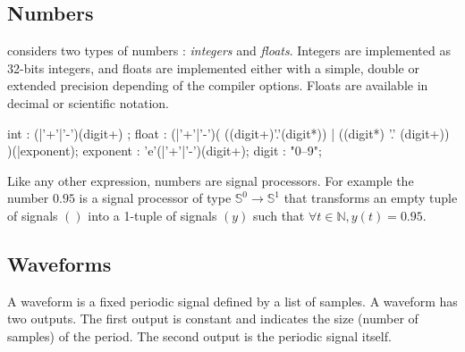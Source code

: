 \subsection{Numbers}

\faust considers two types of numbers : \textit{integers} and \textit{floats}. Integers are implemented as 32-bits integers, and floats are implemented either with a simple, double or extended precision depending of the compiler options. Floats are available in decimal or scientific notation. 

  \begin{rail}
  int : (|'+'|'-')(digit+) ;
  float : (|'+'|'-')( ((digit+)'.'(digit*)) | ((digit*) '.' (digit+)) )(|exponent);
  exponent : 'e'(|'+'|'-')(digit+);
  digit : "0--9";
  \end{rail}

\bigskip

Like any other \faust expression, numbers are signal processors. For example the number $0.95$ is a signal processor of type $\mathbb{S}^{0}\rightarrow\mathbb{S}^{1}$ that transforms an empty tuple of signals $()$ into a 1-tuple of signals $(y)$ such that $\forall t\in\mathbb{N}, y(t)=0.95$.



\subsection{Waveforms}

A waveform is a fixed periodic signal defined by a list of samples. A waveform has two outputs. The first output is constant and indicates the size (number of samples) of the period. The second output is the periodic signal itself. 

